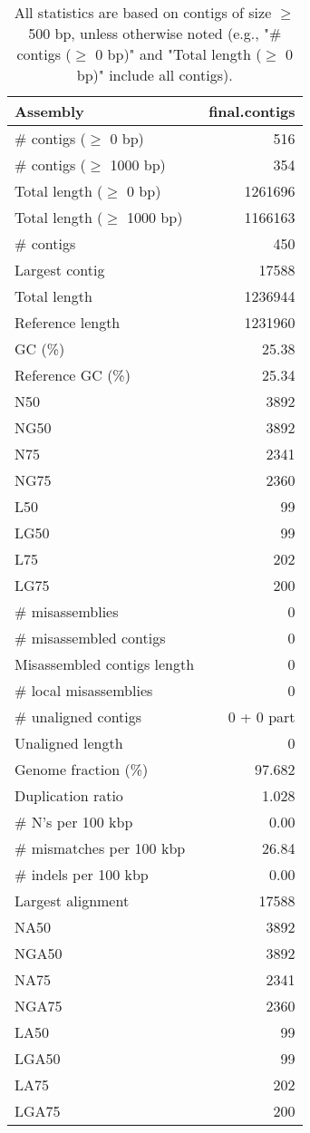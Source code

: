 \documentclass[12pt,a4paper]{article}
\begin{document}
\begin{table}[ht]
\begin{center}
\caption{All statistics are based on contigs of size $\geq$ 500 bp, unless otherwise noted (e.g., "\# contigs ($\geq$ 0 bp)" and "Total length ($\geq$ 0 bp)" include all contigs).}
\begin{tabular}{|l*{1}{|r}|}
\hline
Assembly & final.contigs \\ \hline
\# contigs ($\geq$ 0 bp) & 516 \\ \hline
\# contigs ($\geq$ 1000 bp) & 354 \\ \hline
Total length ($\geq$ 0 bp) & 1261696 \\ \hline
Total length ($\geq$ 1000 bp) & 1166163 \\ \hline
\# contigs & 450 \\ \hline
Largest contig & 17588 \\ \hline
Total length & 1236944 \\ \hline
Reference length & 1231960 \\ \hline
GC (\%) & 25.38 \\ \hline
Reference GC (\%) & 25.34 \\ \hline
N50 & 3892 \\ \hline
NG50 & 3892 \\ \hline
N75 & 2341 \\ \hline
NG75 & 2360 \\ \hline
L50 & 99 \\ \hline
LG50 & 99 \\ \hline
L75 & 202 \\ \hline
LG75 & 200 \\ \hline
\# misassemblies & 0 \\ \hline
\# misassembled contigs & 0 \\ \hline
Misassembled contigs length & 0 \\ \hline
\# local misassemblies & 0 \\ \hline
\# unaligned contigs & 0 + 0 part \\ \hline
Unaligned length & 0 \\ \hline
Genome fraction (\%) & 97.682 \\ \hline
Duplication ratio & 1.028 \\ \hline
\# N's per 100 kbp & 0.00 \\ \hline
\# mismatches per 100 kbp & 26.84 \\ \hline
\# indels per 100 kbp & 0.00 \\ \hline
Largest alignment & 17588 \\ \hline
NA50 & 3892 \\ \hline
NGA50 & 3892 \\ \hline
NA75 & 2341 \\ \hline
NGA75 & 2360 \\ \hline
LA50 & 99 \\ \hline
LGA50 & 99 \\ \hline
LA75 & 202 \\ \hline
LGA75 & 200 \\ \hline
\end{tabular}
\end{center}
\end{table}
\end{document}
